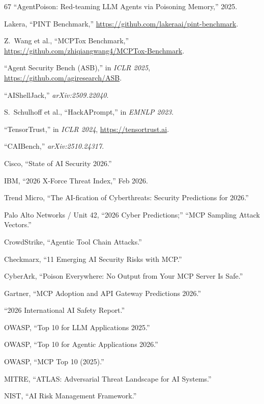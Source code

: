 \documentclass[11pt,letterpaper]{article}
\begin{document}
\begin{thebibliography}{67}
``AgentPoison: Red-teaming LLM Agents via Poisoning Memory,'' 2025.

Lakera, ``PINT Benchmark,'' \url{https://github.com/lakeraai/pint-benchmark}.

Z.~Wang et al., ``MCPTox Benchmark,'' \url{https://github.com/zhiqiangwang4/MCPTox-Benchmark}.

``Agent Security Bench (ASB),'' in \textit{ICLR 2025}, \url{https://github.com/agiresearch/ASB}.

``AIShellJack,'' \textit{arXiv:2509.22040}.

S.~Schulhoff et al., ``HackAPrompt,'' in \textit{EMNLP 2023}.

``TensorTrust,'' in \textit{ICLR 2024}, \url{https://tensortrust.ai}.

``CAIBench,'' \textit{arXiv:2510.24317}.

Cisco, ``State of AI Security 2026.''

IBM, ``2026 X-Force Threat Index,'' Feb 2026.

Trend Micro, ``The AI-fication of Cyberthreats: Security Predictions for 2026.''

Palo Alto Networks / Unit 42, ``2026 Cyber Predictions;'' ``MCP Sampling Attack Vectors.''

CrowdStrike, ``Agentic Tool Chain Attacks.''

Checkmarx, ``11 Emerging AI Security Risks with MCP.''

CyberArk, ``Poison Everywhere: No Output from Your MCP Server Is Safe.''

Gartner, ``MCP Adoption and API Gateway Predictions 2026.''

``2026 International AI Safety Report.''

OWASP, ``Top 10 for LLM Applications 2025.''

OWASP, ``Top 10 for Agentic Applications 2026.''

OWASP, ``MCP Top 10 (2025).''

MITRE, ``ATLAS: Adversarial Threat Landscape for AI Systems.''

NIST, ``AI Risk Management Framework.''


\end{thebibliography}
\end{document}
